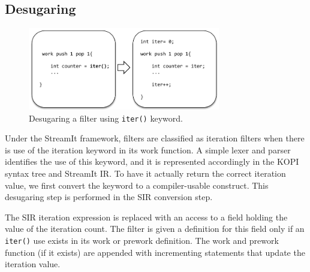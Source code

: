 \subsection{Desugaring}
\label{sec:desugar}

%
%
%
%
%
%
%
%
%
%


\begin{figure}[t!]
\centering
\includegraphics[width=3.3in]{figures/desugaring_filters.pdf}
\caption{Desugaring a filter using \texttt{iter()} keyword.\protect\label{fig:desugar}}
\end{figure}


Under the StreamIt framework, filters are classified as iteration filters when there is use of the iteration keyword in its work function.  A simple lexer and parser identifies the use of this keyword, and it is represented accordingly in the KOPI syntax tree and StreamIt IR.  To have it actually return the correct iteration value, we first convert the keyword to a compiler-usable construct.  This desugaring step is performed in the SIR conversion step.

The SIR iteration expression is replaced with an access to a field holding the value of the iteration count.  The filter is given a definition for this field only if an {\tt iter()} use exists in its work or prework definition.  The work and prework function (if it exists) are appended with incrementing statements that update the iteration value.

